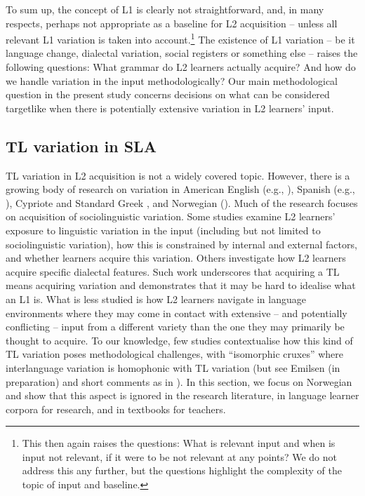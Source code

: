 \documentclass[output=paper,colorlinks,citecolor=brown,modfonts,nonflat]{../langscibook}
\begin{document}
To sum up, the concept of L1 is clearly not straightforward, and, in many respects, perhaps not appropriate as a baseline for L2 acquisition – unless all relevant L1 variation is taken into account.{\footnote{This then again raises the questions: What is relevant input and when is input not relevant, if it were to be not relevant at any points? We do not address this any further, but the questions highlight the complexity of the topic of input and baseline.}} The existence of L1 variation – be it language change, dialectal variation, social registers or something else – raises the following questions: What grammar do L2 learners actually acquire? And how do we handle variation in the input methodologically? Our main methodological question in the present study concerns decisions on what can be considered targetlike when there is potentially extensive variation in L2 learners’ input.

\subsection{TL variation in SLA}\label{sec:emilsen:2.3}

TL variation in L2 acquisition is not a widely covered topic. However, there is a growing body of research on variation in American English (e.g., \citealt{Eisenstein1986}), Spanish (e.g., \citealt{Gudmestad2012}), Cypriote and Standard Greek \citep{LeivadaEtAl2017}, and Norwegian (\citealt{RodinaWestergaard2015Bilingualism}). Much of the research focuses on acquisition of sociolinguistic variation. Some studies examine L2 learners’ exposure to linguistic variation in the input (including but not limited to sociolinguistic variation), how this is constrained by internal and external factors, and whether learners acquire this variation. Others investigate how L2 learners acquire specific dialectal features. Such work underscores that acquiring a TL means acquiring variation and demonstrates that it may be hard to idealise what an L1 is. What is less studied is how L2 learners navigate in language environments where they may come in contact with extensive – and potentially conflicting – input from a different variety than the one they may primarily be thought to acquire. To our knowledge, few studies contextualise how this kind of TL variation poses methodological challenges, with ``isomorphic cruxes'' where interlanguage variation is homophonic with TL variation (but see Emilsen (in preparation) and short comments as in \citet[17]{Cornips2018}). In this section, we focus on Norwegian and show that this aspect is ignored in the research literature, in language learner corpora for research, and in textbooks for teachers.
\end{document}
